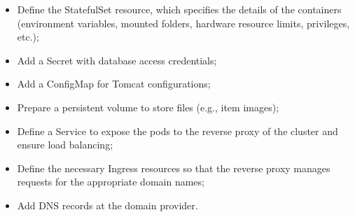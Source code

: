 \documentclass[12pt, a4paper, renqo, final]{amsart}
\begin{document}
		\begin{itemize}
		    \item Define the StatefulSet resource, which specifies the details of the containers (environment variables, mounted folders, hardware resource limits, privileges, etc.);
		    \item Add a Secret with database access credentials;
		    \item Add a ConfigMap for Tomcat configurations;
		    \item Prepare a persistent volume to store files (e.g., item images);
		    \item Define a Service to expose the pods to the reverse proxy of the cluster and ensure load balancing;
		    \item Define the necessary Ingress resources so that the reverse proxy manages requests for the appropriate domain names;
		    \item Add DNS records at the domain provider.
		\end{itemize}

					
		
\end{document}
